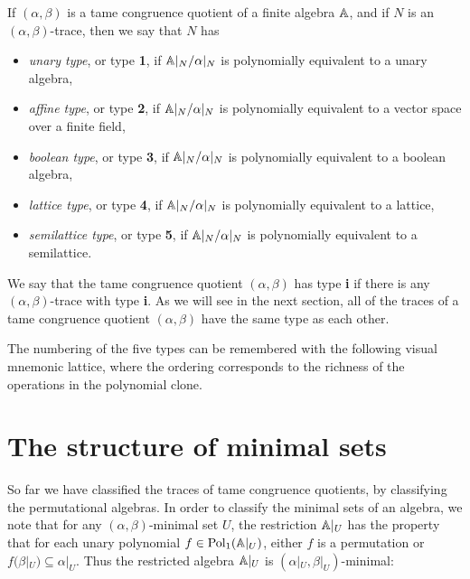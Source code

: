 \begin{appendices}
\begin{defn} If $(\alpha,\beta)$ is a tame congruence quotient of a finite algebra $\mathbb{A}$, and if $N$ is an $(\alpha,\beta)$-trace, then we say that $N$ has
\begin{itemize}
\item \emph{unary type}, or type \textbf{1}, if $\mathbb{A}|_N/\alpha|_N$ is polynomially equivalent to a unary algebra,
\item \emph{affine type}, or type \textbf{2}, if $\mathbb{A}|_N/\alpha|_N$ is polynomially equivalent to a vector space over a finite field,
\item \emph{boolean type}, or type \textbf{3}, if $\mathbb{A}|_N/\alpha|_N$ is polynomially equivalent to a boolean algebra,
\item \emph{lattice type}, or type \textbf{4}, if $\mathbb{A}|_N/\alpha|_N$ is polynomially equivalent to a lattice,
\item \emph{semilattice type}, or type \textbf{5}, if $\mathbb{A}|_N/\alpha|_N$ is polynomially equivalent to a semilattice.
\end{itemize}
We say that the tame congruence quotient $(\alpha,\beta)$ has type \textbf{i} if there is any $(\alpha,\beta)$-trace with type \textbf{i}. As we will see in the next section, all of the traces of a tame congruence quotient $(\alpha,\beta)$ have the same type as each other.
\end{defn}

The numbering of the five types can be remembered with the following visual mnemonic lattice, where the ordering corresponds to the richness of the operations in the polynomial clone.

\begin{center}
\end{center}


\section{The structure of minimal sets}

So far we have classified the traces of tame congruence quotients, by classifying the permutational algebras. In order to classify the minimal sets of an algebra, we note that for any $(\alpha,\beta)$-minimal set $U$, the restriction $\mathbb{A}|_U$ has the property that for each unary polynomial $f \in \operatorname{Pol}_1(\mathbb{A}|_U)$, either $f$ is a permutation or $f(\beta|_U) \subseteq \alpha|_U$. Thus the restricted algebra $\mathbb{A}|_U$ is $(\alpha|_U,\beta|_U)$-minimal:


\end{appendices}
